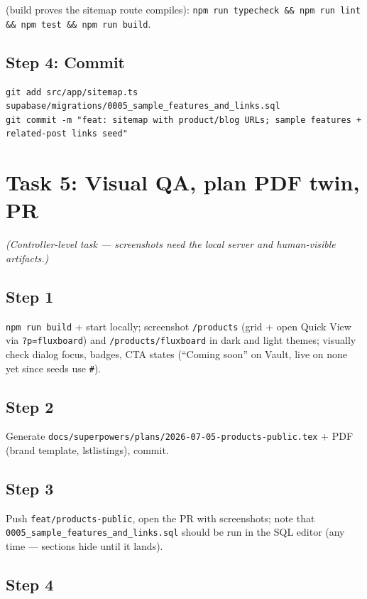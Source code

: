 \documentclass[11pt,a4paper]{article}
\begin{document}
(build proves the sitemap route compiles): \texttt{npm run typecheck \&\& npm run lint \&\& npm
test \&\& npm run build}.

\subsection*{Step 4: Commit}

\begin{lstlisting}
git add src/app/sitemap.ts supabase/migrations/0005_sample_features_and_links.sql
git commit -m "feat: sitemap with product/blog URLs; sample features + related-post links seed"
\end{lstlisting}

\section{Task 5: Visual QA, plan PDF twin, PR}

\textit{(Controller-level task --- screenshots need the local server and human-visible
artifacts.)}

\subsection*{Step 1}

\texttt{npm run build} + start locally; screenshot \texttt{/products} (grid + open Quick View via
\texttt{?p=fluxboard}) and \texttt{/products/fluxboard} in dark and light themes; visually check
dialog focus, badges, CTA states (``Coming soon'' on Vault, live on none yet since seeds use
\texttt{\#}).

\subsection*{Step 2}

Generate \texttt{docs/superpowers/plans/2026-07-05-products-public.tex} + PDF (brand template,
lstlistings), commit.

\subsection*{Step 3}

Push \texttt{feat/products-public}, open the PR with screenshots; note that
\texttt{0005\_sample\_features\_and\_links.sql} should be run in the SQL editor (any time ---
sections hide until it lands).

\subsection*{Step 4}
\end{document}
